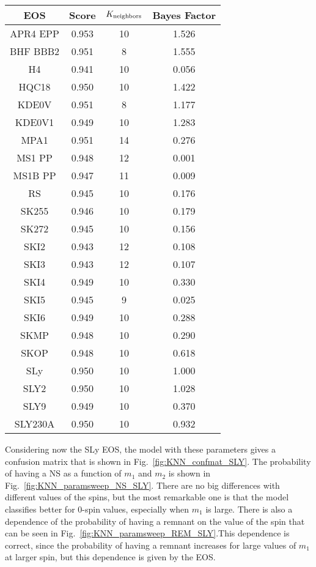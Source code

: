 \begin{table}
    \centering
\begin{tabular}{cccc}
\hline
    EOS & Score & $K_{\rm neighbors}$ & Bayes Factor\\
    \hline 
    \hline
    APR4 EPP & 0.953 & 10 &  1.526 \\
    BHF BBB2 & 0.951 & 8  &  1.555 \\
    H4       & 0.941 & 10 &  0.056 \\
    HQC18    & 0.950 & 10 &  1.422 \\
    KDE0V    & 0.951 & 8  &  1.177 \\
    KDE0V1   & 0.949 & 10 &  1.283 \\
    MPA1     & 0.951 & 14 &  0.276 \\
    MS1 PP   & 0.948 & 12 &  0.001 \\
    MS1B PP  & 0.947 & 11 &  0.009 \\
    RS       & 0.945 & 10 &  0.176 \\
    SK255    & 0.946 & 10 &  0.179 \\
    SK272    & 0.945 & 10 &  0.156 \\
    SKI2     & 0.943 & 12 &  0.108 \\ 
    SKI3     & 0.943 & 12 &  0.107 \\
    SKI4     & 0.949 & 10 &  0.330 \\
    SKI5     & 0.945 & 9  &  0.025 \\
    SKI6     & 0.949 & 10 &  0.288 \\
    SKMP     & 0.948 & 10 &  0.290 \\
    SKOP     & 0.948 & 10 &  0.618 \\
    SLy      & 0.950 & 10 &  1.000 \\
    SLY2     & 0.950 & 10 &  1.028 \\
    SLY9     & 0.949 & 10 &  0.370 \\
    SLY230A  & 0.950 & 10 &  0.932 \\
    
\hline
\end{tabular}
    \caption{}
    \label{tab:KNN_CV}
\end{table}


Considering now the SLy EOS,  the model with these parameters gives a confusion matrix that is shown in Fig.~\ref{fig:KNN_confmat_SLY}.  The probability of having a NS as a function of $m_1$ and $m_2$  is shown in Fig.~\ref{fig:KNN_paramsweep_NS_SLY}. There are no big differences with different values of the spins, but the most remarkable one is that the model classifies better for 0-spin values, especially when $m_1$ is large.  There is also a dependence of the probability of having a remnant on the value of the spin that can be seen in Fig.~\ref{fig:KNN_paramsweep_REM_SLY}.This dependence is correct, since the probability of having a remnant increases for large values of $m_1$ at larger spin, but this dependence is given by the EOS. 

